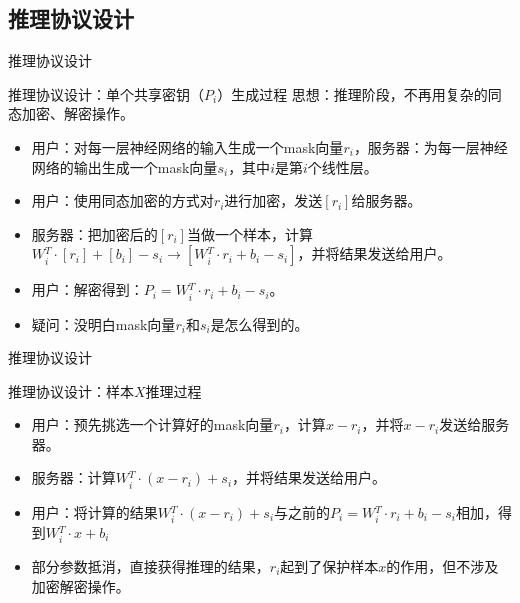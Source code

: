 \documentclass{beamer}
\begin{document}
\subsection{推理协议设计}
\begin{frame}{推理协议设计}
    \begin{exampleblock}{推理协议设计：单个共享密钥（$P_i$）生成过程}
    思想：推理阶段，不再用复杂的同态加密、解密操作。
        	\begin{itemize}
    		\item {\footnotesize 用户：对每一层神经网络的输入生成一个mask向量$r_i$，服务器：为每一层神经网络的输出生成一个mask向量$s_i$，其中$i$是第$i$个线性层。}
    		\item {\footnotesize 用户：使用同态加密的方式对$r_i$进行加密，发送$[r_i]$给服务器。}
    		\item {\footnotesize 服务器：把加密后的$[r_i]$当做一个样本，计算$W{_i^T} \cdot [r_i] + [b_i] - s_i\longrightarrow [W{_i^T} \cdot r_i + b_i - s_i ]$，并将结果发送给用户。}
    		\item {\footnotesize 用户：解密得到：$P_i=W{_i^T} \cdot r_i + b_i - s_i$。}
    		\item {\footnotesize {\color {blue} 疑问：没明白mask向量$r_i$和$s_i$是怎么得到的。}}
    	\end{itemize}
    \end{exampleblock}
\end{frame}


\begin{frame}{推理协议设计}
    \begin{exampleblock}{推理协议设计：样本$X$推理过程}
        	\begin{itemize}
    		\item {\footnotesize 用户：预先挑选一个计算好的mask向量$r_i$，计算$x-r_i$，并将$x-r_i$发送给服务器。}
    		\item {\footnotesize 服务器：计算$W{_i^T} \cdot (x-r_i) + s_i$，并将结果发送给用户。}
    		\item {\footnotesize 用户：将计算的结果$W{_i^T} \cdot (x-r_i) + s_i$与之前的$P_i=W{_i^T} \cdot r_i + b_i - s_i$相加，得到$W{_i^T} \cdot x + b_i$}
    		\item {\footnotesize 部分参数抵消，直接获得推理的结果，$r_i$起到了保护样本$x$的作用，但不涉及加密解密操作。}
    	\end{itemize}
    \end{exampleblock}
\end{frame}
\end{document}
